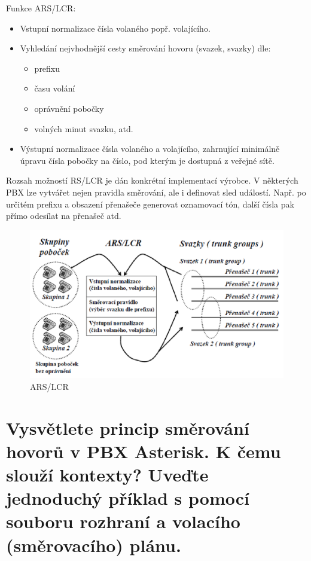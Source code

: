 \noindent Funkce ARS/LCR:
\begin{itemize}[noitemsep]
    \item Vstupní normalizace čísla volaného popř. volajícího.
    \item Vyhledání nejvhodnější cesty směrování hovoru (svazek, svazky) dle:
    \begin{itemize}[noitemsep]
        \item prefixu
        \item času volání
        \item oprávnění pobočky
        \item volných minut svazku, atd.
    \end{itemize}
    \item Výstupní normalizace čísla volaného a volajícího, zahrnující minimálně úpravu čísla pobočky na číslo, pod kterým je dostupná z veřejné sítě.
\end{itemize}

Rozsah možností RS/LCR je dán konkrétní implementací výrobce. V některých PBX lze vytvářet nejen pravidla směrování, ale i definovat sled událostí. Např. po určitém prefixu a obsazení přenašeče generovat oznamovací tón, další čísla pak přímo odesílat na přenašeč atd.


\begin{figure}[h!]
    \begin{center}
        \includegraphics[width=\textwidth]{images/otazka5.png}
        \caption{ARS/LCR}
        \label{img:2}
    \end{center}
\end{figure}

\section{Vysvětlete princip směrování hovorů v PBX Asterisk. K čemu slouží kontexty? Uveďte jednoduchý příklad s pomocí souboru rozhraní a volacího (směrovacího) plánu.}

